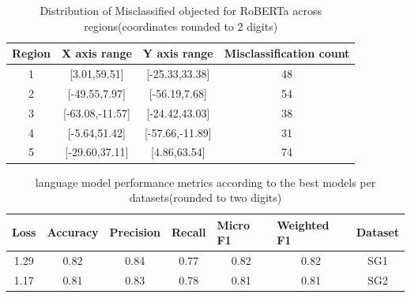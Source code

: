 \documentclass[11pt,a4paper]{article}
\begin{document}
\begin{table}[h]
\centering
\caption{Distribution of Misclassified objected for RoBERTa across regions(coordinates rounded to 2 digits)}
\label{tab:mscount}
\begin{adjustbox}{width=0.9\linewidth,center}
\begin{tabular}{cccc}
\hline
\multicolumn{1}{|c|}{\textbf{Region}} & \multicolumn{1}{l|}{\textbf{X axis range}} & \multicolumn{1}{l|}{\textbf{Y axis range}} & \multicolumn{1}{l|}{\textbf{Misclassification count}} \\ \hline
1                                     & {[}3.01,59.51{]}                           & {[}-25.33,33.38{]}                         & 48                                                    \\
2                                     & {[}-49.55,7.97{]}                          & {[}-56.19,7.68{]}                          & 54                                                    \\
3                                     & {[}-63.08,-11.57{]}                        & {[}-24.42,43.03{]}                         & 38                                                    \\
4                                     & {[}-5.64,51.42{]}                          & {[}-57.66,-11.89{]}                        & 31                                                    \\
5                                     & {[}-29.60,37.11{]}                         & {[}4.86,63.54{]}                           & 74                                                   
\end{tabular}
\end{adjustbox}
\end{table}
\begin{table}[h]
\centering
\caption{language model performance metrics according to the best models per datasets(rounded to two digits)}
\label{tab:model_metric}
\begin{tabular}{ccccccc}
\hline
\multicolumn{1}{|c|}{\textbf{Loss}} & \multicolumn{1}{l|}{\textbf{Accuracy}} & \multicolumn{1}{l|}{\textbf{Precision}} & \multicolumn{1}{l|}{\textbf{Recall}} & \multicolumn{1}{l|}{\textbf{Micro F1}} & \multicolumn{1}{l|}{\textbf{Weighted F1}} & \multicolumn{1}{l|}{\textbf{Dataset}} \\ \hline
1.29                                & 0.82                                   & 0.84                                    & 0.77                                 & 0.82                                   & 0.82                                      & SG1                                   \\
1.17                                & 0.81                                   & 0.83                                    & 0.78                                 & 0.81                                   & 0.81                                      & SG2                                  
\end{tabular}
\end{table}
\end{document}
